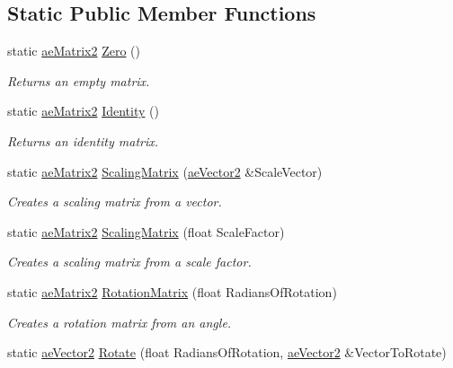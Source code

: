 \subsection*{Static Public Member Functions}
\begin{DoxyCompactItemize}
\item 
static \hyperlink{structae_core_1_1ae_matrix2}{ae\+Matrix2} \hyperlink{structae_core_1_1ae_matrix2_aa314cad424dcb8d7ee122f1397fca4fb}{Zero} ()
\begin{DoxyCompactList}\small\item\em Returns an empty matrix. \end{DoxyCompactList}\item 
static \hyperlink{structae_core_1_1ae_matrix2}{ae\+Matrix2} \hyperlink{structae_core_1_1ae_matrix2_af67a31c083ff59452091bc8527b3e81e}{Identity} ()
\begin{DoxyCompactList}\small\item\em Returns an identity matrix. \end{DoxyCompactList}\item 
static \hyperlink{structae_core_1_1ae_matrix2}{ae\+Matrix2} \hyperlink{structae_core_1_1ae_matrix2_af6b83fc1bdf500046cc1dc179f7e7bd7}{Scaling\+Matrix} (\hyperlink{structae_core_1_1ae_vector2}{ae\+Vector2} \&Scale\+Vector)
\begin{DoxyCompactList}\small\item\em Creates a scaling matrix from a vector. \end{DoxyCompactList}\item 
static \hyperlink{structae_core_1_1ae_matrix2}{ae\+Matrix2} \hyperlink{structae_core_1_1ae_matrix2_a1a3437ad1dbb0a69570ab587e23205e8}{Scaling\+Matrix} (float Scale\+Factor)
\begin{DoxyCompactList}\small\item\em Creates a scaling matrix from a scale factor. \end{DoxyCompactList}\item 
static \hyperlink{structae_core_1_1ae_matrix2}{ae\+Matrix2} \hyperlink{structae_core_1_1ae_matrix2_afbdb5f8de5d189d44d91ede806a06d1f}{Rotation\+Matrix} (float Radians\+Of\+Rotation)
\begin{DoxyCompactList}\small\item\em Creates a rotation matrix from an angle. \end{DoxyCompactList}\item 
static \hyperlink{structae_core_1_1ae_vector2}{ae\+Vector2} \hyperlink{structae_core_1_1ae_matrix2_aa6547cd8f9036d87ce781ce83510e307}{Rotate} (float Radians\+Of\+Rotation, \hyperlink{structae_core_1_1ae_vector2}{ae\+Vector2} \&Vector\+To\+Rotate)

\end{DoxyCompactItemize}
